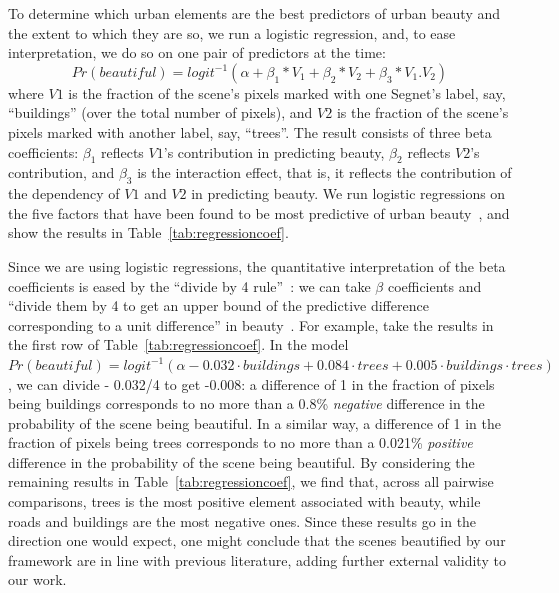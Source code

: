 To determine which urban elements are the best predictors of urban beauty and the extent to which they are so, we run a logistic regression, and, to ease interpretation, we do so on one pair of predictors at the time: 
\begin{equation}
Pr(beautiful) = logit^{-1}(\alpha + \beta_1 * V_1 + \beta_2 * V_2  + \beta_3 * V_{1}.V_{2} )
\label{eq:regression} 
\end{equation}
where $V1$ is the fraction of the scene's pixels marked with one Segnet's label, say, ``buildings'' (over the total number of pixels),  and $V2$ is the fraction of the scene's pixels marked with another label, say, ``trees''. The result consists of three beta coefficients: $\beta_1$ reflects $V1$'s contribution in predicting beauty,  $\beta_2$ reflects $V2$'s contribution, and $\beta_3$ is the interaction effect, that is, it reflects the contribution of the dependency of $V1$ and $V2$ in predicting beauty. We run logistic regressions on the five factors that have been found to be most predictive of urban beauty~\cite{quercia2014aesthetic, ewing2013measuring, alexander1977pattern}, and show the results in Table~\ref{tab:regressioncoef}.


Since we are using logistic regressions, the quantitative interpretation of the beta coefficients is eased by the ``divide by 4 rule''~\cite{vaughn2008data}: we can take $\beta$ coefficients and ``divide them by 4 to get an upper bound of the predictive difference corresponding to a unit difference'' in beauty~\cite{vaughn2008data}. For example, take the results in the first row of Table~\ref{tab:regressioncoef}. In the model $Pr(beautiful) = logit^{-1}(\alpha - 0.032 \cdot buildings + 0.084 \cdot trees + 0.005 \cdot  buildings \cdot trees)$, we can divide - 0.032/4 to get -0.008: a difference of 1 in the fraction of pixels being buildings corresponds to no more than a 0.8\% \emph{negative} difference in the probability of the scene being beautiful. In a similar way, a difference of 1 in the fraction of pixels being trees corresponds to no more than a 0.021\% \emph{positive} difference in the probability of the scene being beautiful. By considering the remaining results in Table~\ref{tab:regressioncoef}, we find that, across all pairwise comparisons, trees is the most positive element associated with beauty, while roads and buildings are the most negative ones. Since these results go in the direction one would expect, one might conclude that the scenes beautified by our framework are in line with previous literature, adding further external validity to our work. 




